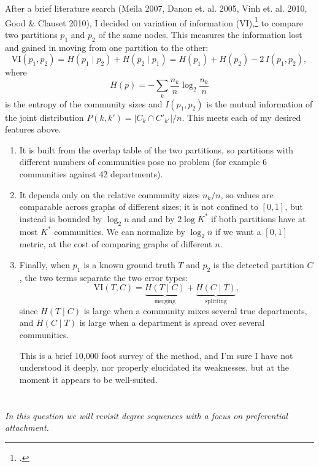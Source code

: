 \documentclass{article}
\begin{document}
\begin{enumerate}
    After a brief literature search (Meila 2007, Danon et. al. 2005, Vinh et. al. 2010, Good \& Clauset 2010), I decided on variation of information (VI),\footcite{meila2007comparing} to compare two partitions $p_1$ and $p_2$ of the same nodes. This measures the information lost and gained in moving from one partition to the other:
\begin{equation}
    \mathrm{VI}(p_1,p_2) = H(p_1 \mid p_2) + H(p_2 \mid p_1) = H(p_1) + H(p_2) - 2\,I(p_1,p_2),
\end{equation}
where $$H(p) = -\sum_k \frac{n_k}{n}\log_2\frac{n_k}{n}$$ is the entropy of the community sizes and $I(p_1,p_2)$ is the mutual information of the joint distribution $P(k,k') = |C_k \cap C'_{k'}|/n$. This meets each of my desired features above. 
\begin{enumerate}
    \item It is built from the overlap table of the two partitions, so partitions with different numbers of communities pose no problem (for example 6 communities against 42 departments).
    \item It depends only on the relative community sizes $n_k/n$, so values are comparable across graphs of different sizes; it is not confined to $[0,1]$, but instead is bounded by $\log_2 n$ and and by $2\log K^*$ if both partitions have at most $K^*$ communities. We can normalize by $\log_2n$ if we want a $[0,1]$ metric, at the cost of comparing graphs of different $n.$
    \item Finally, when $p_1$ is a known ground truth $T$ and $p_2$ is the detected partition $C$, the two terms separate the two error types:
\begin{equation}
    \mathrm{VI}(T,C) = \underbrace{H(T \mid C)}_{\text{merging}} + \underbrace{H(C \mid T)}_{\text{splitting}},
\end{equation}
since $H(T \mid C)$ is large when a community mixes several true departments, and $H(C \mid T)$ is large when a department is spread over several communities.

This is a brief 10,000 foot survey of the method, and I'm sure I have not understood it deeply, nor properly elucidated its weaknesses, but at the moment it appears to be well-suited. 
\end{enumerate}

\end{enumerate}

\clearpage
\section{}
\textit{In this question we will revisit degree sequences with a focus on preferential attachment.}
\end{document}
